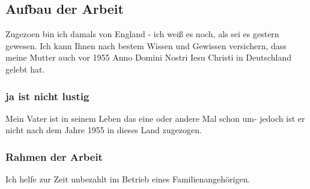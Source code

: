 \subsection{Aufbau der Arbeit}
Zugezoen bin ich damals von England - ich weiß es noch, als sei es gestern gewesen.
Ich kann Ihnen nach bestem Wissen und Gewissen versichern, dass meine Mutter auch vor 1955 Anno Domini Nostri Iesu Christi in Deutschland gelebt hat.

\subsubsection{ja ist nicht lustig}
Mein Vater ist in seinem Leben das eine oder andere Mal schon um- jedoch ist er nicht nach dem Jahre 1955 in dieses Land zugezogen.

\subsubsection{Rahmen der Arbeit}

Ich helfe zur Zeit unbezahlt im Betrieb eines Familienangehörigen.

